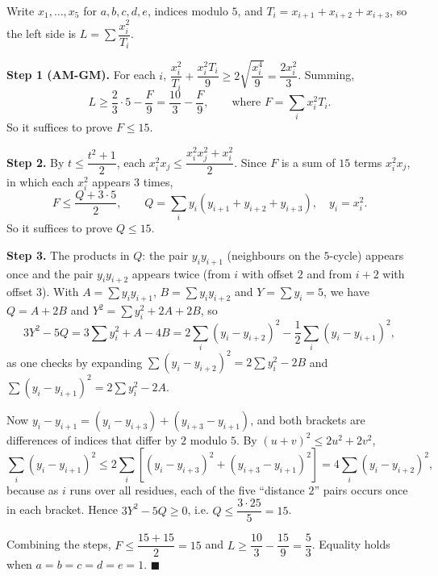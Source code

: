Write $x_1,\dots,x_5$ for $a,b,c,d,e$, indices modulo $5$, and $T_i=x_{i+1}+x_{i+2}+x_{i+3}$, so the left side is $L=\sum\dfrac{x_i^2}{T_i}$.

\textbf{Step 1 (AM-GM).} For each $i$, $\dfrac{x_i^2}{T_i}+\dfrac{x_i^2T_i}{9}\ge2\sqrt{\dfrac{x_i^4}{9}}=\dfrac{2x_i^2}{3}$. Summing,
\[L\ge\dfrac{2}{3}\cdot5-\dfrac {F}{9}=\dfrac{10}{3}-\dfrac {F}{9},\qquad\text{where }F=\sum_i x_i^2T_i.\]
So it suffices to prove $F\le15$.

\textbf{Step 2.} By $t\le\dfrac{t^2+1}{2}$, each $x_i^2x_j\le\dfrac{x_i^2x_j^2+x_i^2}{2}$. Since $F$ is a sum of $15$ terms $x_i^2x_j$, in which each $x_i^2$ appears $3$ times,
\[F\le\dfrac{Q+3\cdot5}{2},\qquad Q=\sum_i y_i(y_{i+1}+y_{i+2}+y_{i+3}),\quad y_i=x_i^2.\]
So it suffices to prove $Q\le15$.

\textbf{Step 3.} The products in $Q$: the pair $y_iy_{i+1}$ (neighbours on the $5$-cycle) appears once and the pair $y_iy_{i+2}$ appears twice (from $i$ with offset $2$ and from $i+2$ with offset $3$). With $A=\sum y_iy_{i+1}$, $B=\sum y_iy_{i+2}$ and $Y=\sum y_i=5$, we have $Q=A+2B$ and $Y^2=\sum y_i^2+2A+2B$, so
\[3Y^2-5Q=3\sum y_i^2+A-4B=2\sum_i(y_i-y_{i+2})^2-\dfrac{1}{2}\sum_i(y_i-y_{i+1})^2,\]
as one checks by expanding $\sum(y_i-y_{i+2})^2=2\sum y_i^2-2B$ and $\sum(y_i-y_{i+1})^2=2\sum y_i^2-2A$.

Now $y_i-y_{i+1}=(y_i-y_{i+3})+(y_{i+3}-y_{i+1})$, and both brackets are differences of indices that differ by $2$ modulo $5$. By $(u+v)^2\le2u^2+2v^2$,
\[\sum_i(y_i-y_{i+1})^2\le2\sum_i\left[(y_i-y_{i+3})^2+(y_{i+3}-y_{i+1})^2\right]=4\sum_i(y_i-y_{i+2})^2,\]
because as $i$ runs over all residues, each of the five ``distance $2$'' pairs occurs once in each bracket. Hence $3Y^2-5Q\ge0$, i.e. $Q\le\dfrac{3\cdot25}{5}=15$.

Combining the steps, $F\le\dfrac{15+15}{2}=15$ and $L\ge\dfrac{10}{3}-\dfrac{15}{9}=\dfrac{5}{3}$. Equality holds when $a=b=c=d=e=1$. $\blacksquare$
